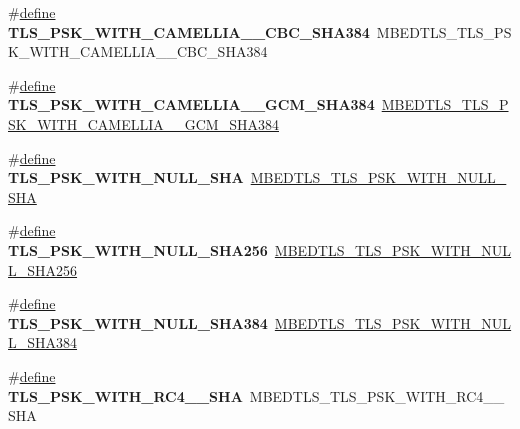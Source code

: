 \begin{DoxyCompactItemize}
\item 
\mbox{\label{compat-1_83_8h_af1841cd84f8c066c52384eab511b9ddc}} 
\#\hyperlink{structdefine}{define} {\bfseries T\+L\+S\+\_\+\+P\+S\+K\+\_\+\+W\+I\+T\+H\+\_\+\+C\+A\+M\+E\+L\+L\+I\+A\+\_\+\_\+\+C\+B\+C\+\_\+\+S\+H\+A384}~M\+B\+E\+D\+T\+L\+S\+\_\+\+T\+L\+S\+\_\+\+P\+S\+K\+\_\+\+W\+I\+T\+H\+\_\+\+C\+A\+M\+E\+L\+L\+I\+A\+\_\+\_\+\+C\+B\+C\+\_\+\+S\+H\+A384
\item 
\mbox{\label{compat-1_83_8h_a3c28fbf514a1eb42b0bd1a04b33af96c}} 
\#\hyperlink{structdefine}{define} {\bfseries T\+L\+S\+\_\+\+P\+S\+K\+\_\+\+W\+I\+T\+H\+\_\+\+C\+A\+M\+E\+L\+L\+I\+A\+\_\+\_\+\+G\+C\+M\+\_\+\+S\+H\+A384}~\hyperlink{ssl__ciphersuites_8h_ae49e849e3aadebb2cfc455f990a613a2}{M\+B\+E\+D\+T\+L\+S\+\_\+\+T\+L\+S\+\_\+\+P\+S\+K\+\_\+\+W\+I\+T\+H\+\_\+\+C\+A\+M\+E\+L\+L\+I\+A\+\_\+\_\+\+G\+C\+M\+\_\+\+S\+H\+A384}
\item 
\mbox{\label{compat-1_83_8h_a2d0cb190aceb6aaa99890d50f34f2256}} 
\#\hyperlink{structdefine}{define} {\bfseries T\+L\+S\+\_\+\+P\+S\+K\+\_\+\+W\+I\+T\+H\+\_\+\+N\+U\+L\+L\+\_\+\+S\+HA}~\hyperlink{ssl__ciphersuites_8h_a29a1417a6a370fea39af2574331049ea}{M\+B\+E\+D\+T\+L\+S\+\_\+\+T\+L\+S\+\_\+\+P\+S\+K\+\_\+\+W\+I\+T\+H\+\_\+\+N\+U\+L\+L\+\_\+\+S\+HA}
\item 
\mbox{\label{compat-1_83_8h_a3a85a0a04a84b48f41a7a4f11b820189}} 
\#\hyperlink{structdefine}{define} {\bfseries T\+L\+S\+\_\+\+P\+S\+K\+\_\+\+W\+I\+T\+H\+\_\+\+N\+U\+L\+L\+\_\+\+S\+H\+A256}~\hyperlink{ssl__ciphersuites_8h_a02fd01670af3ffa7207c996ccf52ee1f}{M\+B\+E\+D\+T\+L\+S\+\_\+\+T\+L\+S\+\_\+\+P\+S\+K\+\_\+\+W\+I\+T\+H\+\_\+\+N\+U\+L\+L\+\_\+\+S\+H\+A256}
\item 
\mbox{\label{compat-1_83_8h_a65af775defd772ada691c84a21318036}} 
\#\hyperlink{structdefine}{define} {\bfseries T\+L\+S\+\_\+\+P\+S\+K\+\_\+\+W\+I\+T\+H\+\_\+\+N\+U\+L\+L\+\_\+\+S\+H\+A384}~\hyperlink{ssl__ciphersuites_8h_a4e1d2aae46aeeba5a32ef8737763a5e8}{M\+B\+E\+D\+T\+L\+S\+\_\+\+T\+L\+S\+\_\+\+P\+S\+K\+\_\+\+W\+I\+T\+H\+\_\+\+N\+U\+L\+L\+\_\+\+S\+H\+A384}
\item 
\mbox{\label{compat-1_83_8h_afc886bab77fa689b1bff975db1f07ee0}} 
\#\hyperlink{structdefine}{define} {\bfseries T\+L\+S\+\_\+\+P\+S\+K\+\_\+\+W\+I\+T\+H\+\_\+\+R\+C4\+\_\+\_\+\+S\+HA}~M\+B\+E\+D\+T\+L\+S\+\_\+\+T\+L\+S\+\_\+\+P\+S\+K\+\_\+\+W\+I\+T\+H\+\_\+\+R\+C4\+\_\+\_\+\+S\+HA

\end{DoxyCompactItemize}
